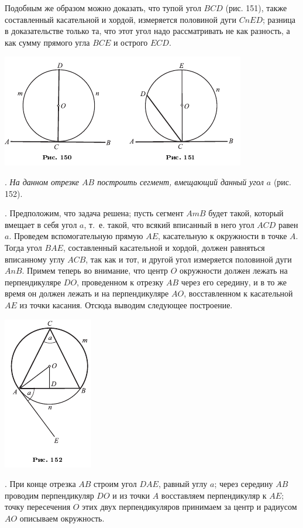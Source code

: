 \documentclass[oneside]{book}
\begin{document}
Подобным же образом можно доказать, что тупой угол $BCD$ (рис. 151), также составленный касательной и хордой, измеряется половиной дуги $CnED$;
разница в доказательстве только та, что этот угол надо рассматривать не как разность, а как сумму прямого угла $BCE$ и острого $ECD$.

\includegraphics{pics/ris-150-151}

.
\emph{На данном отрезке $AB$ построить сегмент, вмещающий данный угол $a$} (рис. 152).

.
Предположим, что задача решена;
пусть сегмент $AmB$ будет такой, который вмещает в себя угол $a$, т.~е. такой, что всякий вписанный в него угол $ACD$ равен $a$.
Проведем вспомогательную прямую $AE$, касательную к окружности в точке $A$.
Тогда угол $BAE$, составленный касательной и хордой, должен равняться вписанному углу $ACB$, так как и тот, и другой угол измеряется половиной дуги $AnB$.
Примем теперь во внимание, что центр $O$ окружности должен лежать на перпендикуляре $DO$, проведенном к отрезку $AB$ через его середину, и в то же время он должен лежать и на перпендикуляре $AO$, восставленном к касательной $AE$ из точки касания.
Отсюда выводим следующее построение.

\includegraphics{pics/ris-152}

.
При конце отрезка $AB$ строим угол $DAE$, равный углу $a$;
через середину $AB$ проводим перпендикуляр $DO$ и из точки $A$ восставляем перпендикуляр к $AE$;
точку пересечения $O$ этих двух перпендикуляров принимаем за центр и радиусом $AO$ описываем окружность.
\end{document}
